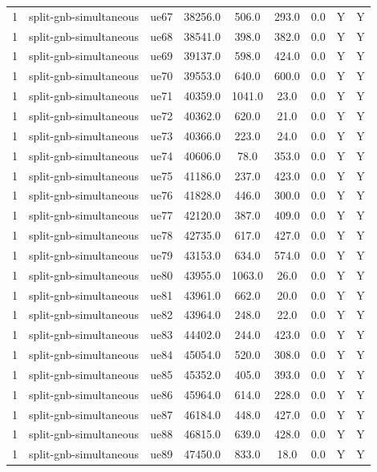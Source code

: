\begin{table}[ht]
\begin{tabular}{|c|c|c|c|c|c|c|c|c|}
1 & split-gnb-simultaneous & ue67 & 38256.0 & 506.0 & 293.0 & 0.0 & Y & Y \\
1 & split-gnb-simultaneous & ue68 & 38541.0 & 398.0 & 382.0 & 0.0 & Y & Y \\
1 & split-gnb-simultaneous & ue69 & 39137.0 & 598.0 & 424.0 & 0.0 & Y & Y \\
1 & split-gnb-simultaneous & ue70 & 39553.0 & 640.0 & 600.0 & 0.0 & Y & Y \\
1 & split-gnb-simultaneous & ue71 & 40359.0 & 1041.0 & 23.0 & 0.0 & Y & Y \\
1 & split-gnb-simultaneous & ue72 & 40362.0 & 620.0 & 21.0 & 0.0 & Y & Y \\
1 & split-gnb-simultaneous & ue73 & 40366.0 & 223.0 & 24.0 & 0.0 & Y & Y \\
1 & split-gnb-simultaneous & ue74 & 40606.0 & 78.0 & 353.0 & 0.0 & Y & Y \\
1 & split-gnb-simultaneous & ue75 & 41186.0 & 237.0 & 423.0 & 0.0 & Y & Y \\
1 & split-gnb-simultaneous & ue76 & 41828.0 & 446.0 & 300.0 & 0.0 & Y & Y \\
1 & split-gnb-simultaneous & ue77 & 42120.0 & 387.0 & 409.0 & 0.0 & Y & Y \\
1 & split-gnb-simultaneous & ue78 & 42735.0 & 617.0 & 427.0 & 0.0 & Y & Y \\
1 & split-gnb-simultaneous & ue79 & 43153.0 & 634.0 & 574.0 & 0.0 & Y & Y \\
1 & split-gnb-simultaneous & ue80 & 43955.0 & 1063.0 & 26.0 & 0.0 & Y & Y \\
1 & split-gnb-simultaneous & ue81 & 43961.0 & 662.0 & 20.0 & 0.0 & Y & Y \\
1 & split-gnb-simultaneous & ue82 & 43964.0 & 248.0 & 22.0 & 0.0 & Y & Y \\
1 & split-gnb-simultaneous & ue83 & 44402.0 & 244.0 & 423.0 & 0.0 & Y & Y \\
1 & split-gnb-simultaneous & ue84 & 45054.0 & 520.0 & 308.0 & 0.0 & Y & Y \\
1 & split-gnb-simultaneous & ue85 & 45352.0 & 405.0 & 393.0 & 0.0 & Y & Y \\
1 & split-gnb-simultaneous & ue86 & 45964.0 & 614.0 & 228.0 & 0.0 & Y & Y \\
1 & split-gnb-simultaneous & ue87 & 46184.0 & 448.0 & 427.0 & 0.0 & Y & Y \\
1 & split-gnb-simultaneous & ue88 & 46815.0 & 639.0 & 428.0 & 0.0 & Y & Y \\
1 & split-gnb-simultaneous & ue89 & 47450.0 & 833.0 & 18.0 & 0.0 & Y & Y \\

\end{tabular}
\end{table}
